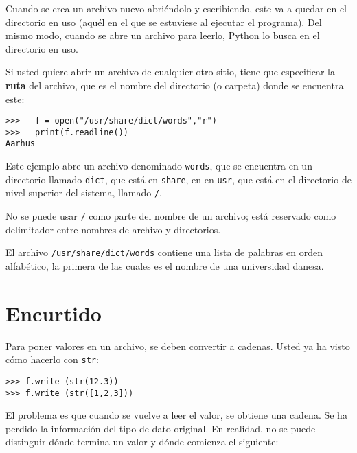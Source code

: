 
Cuando se crea un archivo nuevo abriéndolo y escribiendo, este va
a quedar en el directorio en uso (aquél en el que se estuviese al
ejecutar el programa). Del mismo modo, cuando se abre un archivo para
leerlo, Python lo busca en el directorio en uso.

Si usted quiere abrir un archivo de cualquier otro sitio, tiene que
especificar la \textbf{ruta} del archivo, que es el nombre del directorio
(o carpeta) donde se encuentra este:
\begin{lstlisting}
>>>   f = open("/usr/share/dict/words","r")
>>>   print(f.readline())
Aarhus
\end{lstlisting}
Este ejemplo abre un archivo denominado \texttt{words}, que se encuentra
en un directorio llamado \texttt{dict}, que está en \texttt{share},
en en \texttt{usr}, que está en el directorio de nivel superior del
sistema, llamado \texttt{/}.

 

No se puede usar \texttt{/} como parte del nombre de un archivo; está
reservado como delimitador entre nombres de archivo y directorios.

El archivo \texttt{/usr/share/dict/words} contiene una lista de palabras
en orden alfabético, la primera de las cuales es el nombre de una
universidad danesa.

\section{Encurtido}


Para poner valores en un archivo, se deben convertir a cadenas. Usted
ya ha visto cómo hacerlo con \texttt{str}:
\begin{lstlisting}
>>> f.write (str(12.3))
>>> f.write (str([1,2,3]))
\end{lstlisting}
 El problema es que cuando se vuelve a leer el valor, se obtiene una
cadena. Se ha perdido la información del tipo de dato original. En
realidad, no se puede distinguir dónde termina un valor y dónde comienza
el siguiente:

